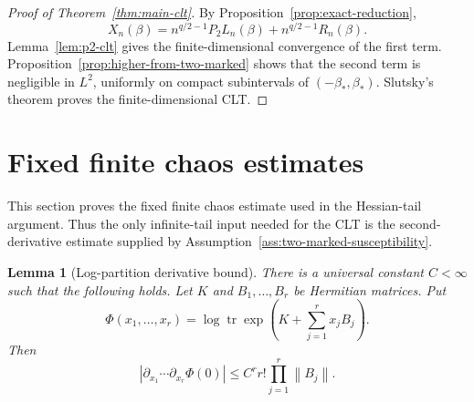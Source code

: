 \documentclass[11pt]{article}
\newtheorem{lemma}[theorem]{Lemma}
\newcommand{\tr}{\operatorname{tr}}
\newcommand{\norm}[1]{\left\lVert #1\right\rVert}
\begin{document}
\begin{proof}[Proof of Theorem~\ref{thm:main-clt}]
  By Proposition~\ref{prop:exact-reduction},
  \begin{equation}\label{eq:Xn-decomposition}
    X_n(\beta)
    =
    n^{q/2-1}P_2L_n(\beta)
    +
    n^{q/2-1}R_n(\beta).
  \end{equation}
  Lemma~\ref{lem:p2-clt} gives the finite-dimensional convergence of the first
  term.  Proposition~\ref{prop:higher-from-two-marked} shows that the second
  term is negligible in $L^2$, uniformly on compact subintervals of
  $(-\beta_*,\beta_*)$.  Slutsky's theorem proves the finite-dimensional CLT.
\end{proof}

\section{Fixed finite chaos estimates}

This section proves the fixed finite chaos estimate used in the Hessian-tail
argument.  Thus the only infinite-tail input needed for the CLT is the
second-derivative estimate supplied by
Assumption~\ref{ass:two-marked-susceptibility}.

\begin{lemma}[Log-partition derivative bound]
  \label{lem:log-partition-derivative-bound}
  There is a universal constant $C<\infty$ such that the following holds.  Let
  $K$ and $B_1,\ldots,B_r$ be Hermitian matrices.  Put
  \begin{equation}\label{eq:logZ-general}
    \Phi(x_1,\ldots,x_r)
    =
    \log\tr\exp\left(K+\sum_{j=1}^r x_jB_j\right).
  \end{equation}
  Then
  \begin{equation}\label{eq:log-partition-derivative-bound}
    \left|
      \partial_{x_1}\cdots\partial_{x_r}\Phi(0)
    \right|
    \leq
    C^r r!\prod_{j=1}^r\norm{B_j}.
  \end{equation}
\end{lemma}
\end{document}
